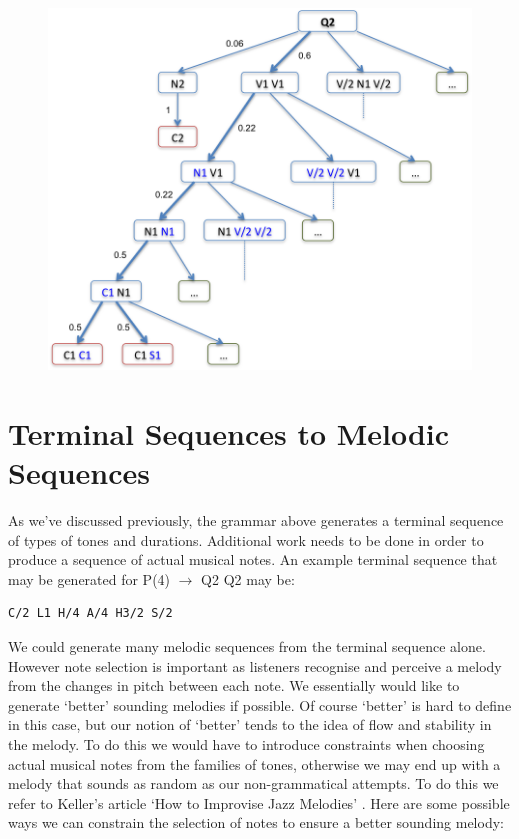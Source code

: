 \documentclass[pdftex,12pt,a4paper]{report}
\begin{document}
\begin{figure}[here]
  \centering
  \includegraphics[scale=0.8]{figure/Q2parsetree.png}
  \label{fig:Q2parsetree}
\end{figure}

\section{Terminal Sequences to Melodic Sequences} \label{terminalsequences}
As we've discussed previously, the grammar above generates a terminal sequence of types of tones and durations. Additional work needs to be done in order to produce a sequence of actual musical notes. An example terminal sequence that may be generated for P(4) $\rightarrow$ Q2 Q2 may be:

\begin{verbatim}
C/2 L1 H/4 A/4 H3/2 S/2
\end{verbatim}

We could generate many melodic sequences from the terminal sequence alone. However note selection is important as listeners recognise and perceive a melody from the changes in pitch between each note. We essentially would like to generate `better' sounding melodies if possible. Of course `better' is hard to define in this case, but our notion of `better' tends to the idea of flow and stability in the melody. To do this we would have to introduce constraints when choosing actual musical notes from the families of tones, otherwise we may end up with a melody that sounds as random as our non-grammatical attempts. To do this we refer to Keller's article `How to Improvise Jazz Melodies' \cite{jazzkeller}. Here are some possible ways we can constrain the selection of notes to ensure a better sounding melody:
\end{document}
